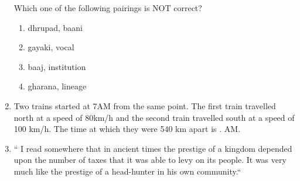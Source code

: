 \documentclass[journal]{IEEEtran}
\begin{document}
\begin{enumerate}
Which one of the following pairings is NOT correct?
\begin{enumerate}
\item dhrupad, baani
\item gayaki, vocal
\item baaj, institution
\item gharana, lineage
\end{enumerate}
\item  Two trains started at 7AM from the same point. The first train travelled north at a speed of 
80km/h and the second train travelled south at a speed of 100 km/h. The time at which they were 540 km apart is .\underline{\hspace{1cm}} AM.
\begin{enumerate}
\end{enumerate}
\item `` I read somewhere that in ancient times the prestige of a kingdom depended upon the number of taxes that it was able to levy on its people. It was very much like the prestige of a head-hunter in his own community.``


\end{enumerate}
\end{document}
